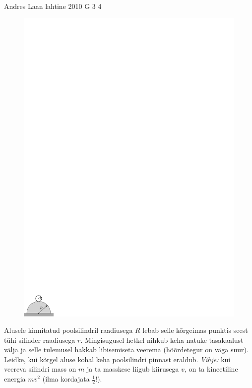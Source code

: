 \documentclass[11pt]{article}
\begin{document}
{%
{Andres Laan} %
{lahtine} %
{2010} %
{G 3} %
{4} %
{
\ifStatement
\begin{figure}
	\vspace{-10pt}
	\hspace{-8pt}
	\includegraphics[width=\linewidth]{2010-lahg-03-silindri_joonis_ipe}
\end{figure}

Alusele kinnitatud poolsilindril raadiusega $R$
lebab selle kõrgeimas punktis seest tühi silinder
raadiusega $r$. Mingisugusel hetkel nihkub keha natuke tasakaalust välja ja
selle tulemusel hakkab libisemiseta veerema (hõõrdetegur on väga suur). Leidke, kui kõrgel aluse kohal keha
poolsilindri pinnast eraldub. \emph{Vihje:} kui veereva silindri mass on $m$ ja
ta masskese liigub kiirusega $v$, on ta kineetiline energia $m v^2$ (ilma
kordajata $\frac12$!).
\fi
}

}
\end{document}
